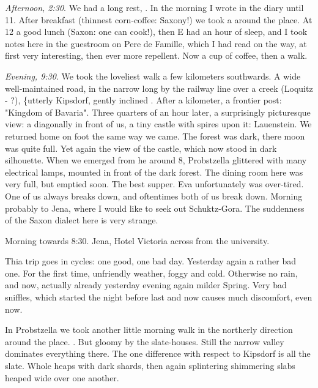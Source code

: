 \documentclass{article}
\begin{document}
\textit{Afternoon, 2:30}. We had a long rest, . In the morning I wrote in the diary until 11. After breakfast (thinnest corn-coffee: Saxony!) we took a  around the place. At 12 a good lunch (Saxon: one can cook!), then E had an hour of sleep, and I took notes here in the guestroom on Pere de Famille, which I had read on the way, at first very interesting, then ever more repellent. Now a cup of coffee, then a walk.

\textit{Evening, 9:30}. We took the loveliest walk a few kilometers southwards. A wide well-maintained road, in the narrow long  by the railway line over a creek (Loquitz - ?), \{utterly Kipsdorf, gently inclined . After a  kilometer, a frontier post: "Kingdom of Bavaria". Three quarters of an hour later, a surprisingly picturesque view: a  diagonally in front of us, a tiny castle with spires upon it: Lauenstein. We returned home on foot the same way we came. The forest was dark, there moon was quite full. Yet again the view of the castle, which now stood in dark silhouette. When we emerged from he  around 8, Probstzella glittered with many electrical lamps, mounted in front of the dark forest. The dining room here was very full, but emptied soon. The best supper. Eva unfortunately was over-tired. One of us always breaks down, and oftentimes both of us break down. 
Morning probably to Jena, where I would like to seek out Schuktz-Gora.
The suddenness of the Saxon dialect here is very strange.

\date{April 1, 1920}
Morning towards 8:30.
Jena, Hotel Victoria across from the university.

Thia trip goes in cycles: one good, one bad day. Yesterday again a rather bad one. For the first time, unfriendly weather, foggy and cold. Otherwise no rain, and now, actually already yesterday evening again milder Spring. Very bad sniffles, which started the night before last and now causes much discomfort, even now.

In Probstzella we took another little morning walk in the northerly direction around the place. . But gloomy by the slate-houses. Still the narrow valley dominates everything there. The one difference with respect to Kipsdorf is all the slate. Whole heaps with dark shards, then again splintering shimmering slabs heaped wide over one another.
\end{document}
